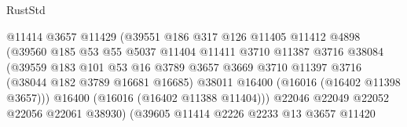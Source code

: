 \begin{lexlean}{RustStd}
\begin{coremodule}
                                        @11414
                                        @3657
                                        @11429
                                        (@39551
                                          @186
                                          @317
                                          @126
                                          @11405
                                          @11412
                                          @4898
                                          (@39560
                                            @185
                                            @53
                                            @55
                                            @5037
                                            @11404
                                            @11411
                                            @3710
                                            @11387
                                            @3716
                                            @38084
                                            (@39559
                                              @183
                                              @101
                                              @53
                                              @16
                                              @3789
                                              @3657
                                              @3669
                                              @3710
                                              @11397
                                              @3716
                                              (@38044 @182 @3789 @16681 @16685)
                                              @38011
                                              @16400
                                              (@16016 (@16402 @11398 @3657)))
                                            @16400
                                            (@16016 (@16402 @11388 @11404)))
                                          @22046
                                          @22049
                                          @22052
                                          @22056
                                          @22061
                                          @38930)
                                        (@39605
                                          @11414
                                          @2226
                                          @2233
                                          @13
                                          @3657
                                          @11420

\end{coremodule}
\end{lexlean}
